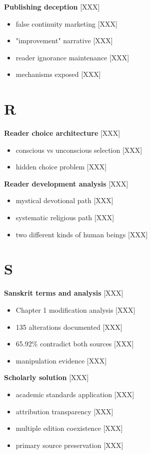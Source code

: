 \documentclass[11pt,twoside]{book}
\begin{document}
\textbf{\textbf{Publishing deception}} {[}XXX]
\begin{itemize}
\item false continuity marketing [XXX]
\item "improvement" narrative [XXX]
\item reader ignorance maintenance [XXX]
\item mechanisms exposed [XXX]
\end{itemize}
\section*{R}
\label{sec:org91ce0e0}

\textbf{\textbf{Reader choice architecture}} {[}XXX]
\begin{itemize}
\item conscious vs unconscious selection [XXX]
\item hidden choice problem [XXX]
\end{itemize}

\textbf{\textbf{Reader development analysis}} {[}XXX]
\begin{itemize}
\item mystical devotional path [XXX]
\item systematic religious path [XXX]
\item two different kinds of human beings [XXX]
\end{itemize}
\section*{S}
\label{sec:orgb85c53f}

\textbf{\textbf{Sanskrit terms and analysis}} {[}XXX]
\begin{itemize}
\item Chapter 1 modification analysis [XXX]
\item 135 alterations documented [XXX]
\item 65.92\% contradict both sources [XXX]
\item manipulation evidence [XXX]
\end{itemize}

\textbf{\textbf{Scholarly solution}} {[}XXX]
\begin{itemize}
\item academic standards application [XXX]
\item attribution transparency [XXX]
\item multiple edition coexistence [XXX]
\item primary source preservation [XXX]
\end{itemize}
\end{document}
